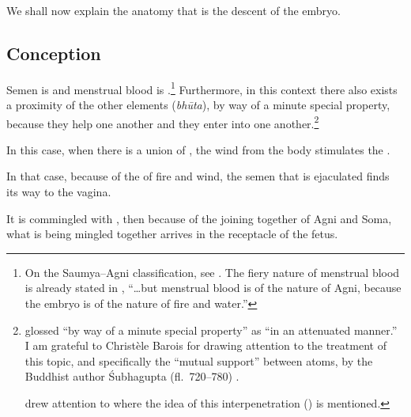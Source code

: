 \begin{translation}


\item[1] 

We shall now explain the anatomy that is the descent of the embryo. 

\subsection{Conception}
\item[3]

Semen is  and menstrual blood is
.\footnote{On the Saumya--Agni
    classification, see \cites{wuja-2004}{ange-2021}[521--527]{das-2003}.
    The fiery nature of menstrual blood is already stated in
    , “\ldots but menstrual blood is of the nature of Agni,
    because the embryo is of the nature of fire and water.”} Furthermore,
in this context there also exists a proximity of the other elements
(\emph{bhūta}), by way of a minute special
property, because they
help one another and they enter into one
another.\footnote{ glossed 
    “by way of a minute special property” as  “in an
    attenuated manner.”\label{anuna-visesena} I am grateful to Christèle
    Barois for drawing attention to the treatment of this topic, and
    specifically the  “mutual support” between atoms,
    by the Buddhist author Śubhagupta (fl.~720--780) 
    \cite[126]{sacc-2015}.
        
         drew attention
        to  where the idea of this interpenetration
        () is mentioned.}


\item [4]

In this case, when there is a union of , the
wind from the body stimulates the .

In that case, because of the  of fire and
wind, the semen that is ejaculated finds its way to the vagina.

It is commingled with , then because
of the joining together of Agni and Soma, what is being mingled together
arrives in the receptacle of the fetus. 


\end{translation}
